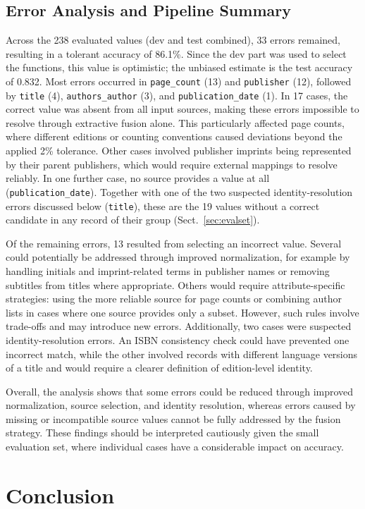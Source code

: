 \documentclass[runningheads]{llncs}
\begin{document}
\subsection{Error Analysis and Pipeline Summary}
Across the 238 evaluated values (dev and test combined), 33 errors remained, resulting in a tolerant accuracy of 86.1\%. Since the dev part was used to select the functions, this value is optimistic; the unbiased estimate is the test accuracy of 0.832. Most errors occurred in \texttt{page\_count} (13) and \texttt{publisher} (12), followed by \texttt{title} (4), \texttt{authors\_author} (3), and \texttt{publication\_date} (1). In 17 cases, the correct value was absent from all input sources, making these errors impossible to resolve through extractive fusion alone. This particularly affected page counts, where different editions or counting conventions caused deviations beyond the applied 2\% tolerance. Other cases involved publisher imprints being represented by their parent publishers, which would require external mappings to resolve reliably. In one further case, no source provides a value at all (\texttt{publication\_date}). Together with one of the two suspected identity-resolution errors discussed below (\texttt{title}), these are the 19 values without a correct candidate in any record of their group (Sect.~\ref{sec:evalset}).

Of the remaining errors, 13 resulted from selecting an incorrect value. Several could potentially be addressed through improved normalization, for example by handling initials and imprint-related terms in publisher names or removing subtitles from titles where appropriate. Others would require attribute-specific strategies: using the more reliable source for page counts or combining author lists in cases where one source provides only a subset. However, such rules involve trade-offs and may introduce new errors. Additionally, two cases were suspected identity-resolution errors. An ISBN consistency check could have prevented one incorrect match, while the other involved records with different language versions of a title and would require a clearer definition of edition-level identity.

Overall, the analysis shows that some errors could be reduced through improved normalization, source selection, and identity resolution, whereas errors caused by missing or incompatible source values cannot be fully addressed by the fusion strategy. These findings should be interpreted cautiously given the small evaluation set, where individual cases have a considerable impact on accuracy.

\section{Conclusion}

% 
% 
\end{document}
